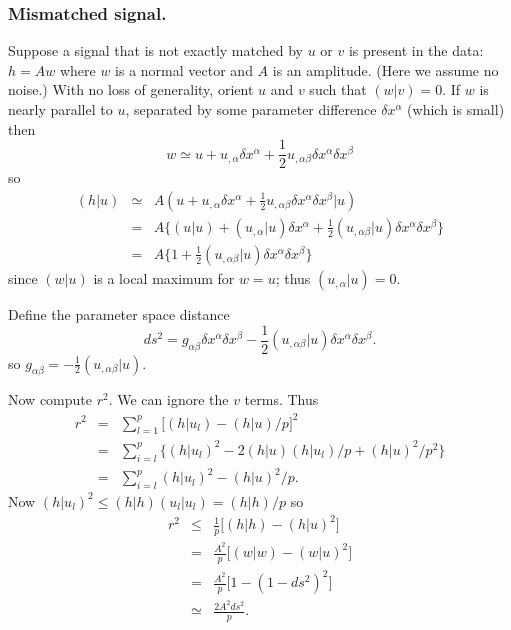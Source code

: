 \subsubsection{Mismatched signal.}
Suppose a signal that is not exactly matched by $u$ or $v$ is present in
the data: $h=Aw$ where $w$ is a normal vector and $A$ is an amplitude.
(Here we assume no noise.)  With no loss of generality, orient $u$ and $v$
such that $(w|v)=0$.  If $w$ is nearly parallel to $u$, separated by some
parameter difference $\delta x^\alpha$ (which is small) then
\begin{equation}
  w \simeq u + u_{,\alpha}\delta x^\alpha 
  + {\textstyle{\frac{1}{2}}}u_{,\alpha\beta}\delta x^\alpha\delta x^\beta
\end{equation}
so
\begin{eqnarray}
  (h|u) &\simeq& A(u + u_{,\alpha}\delta x^\alpha 
  + {\textstyle{\frac{1}{2}}} u_{,\alpha\beta}\delta x^\alpha\delta x^\beta|u)
  \nonumber\\
  &=& A\bigl\{ (u|u) + (u_{,\alpha}|u)\delta x^\alpha
  + {\textstyle{\frac{1}{2}}} (u_{,\alpha\beta}|u)\delta x^\alpha\delta x^\beta
  \bigr\}\nonumber\\
  &=& A\bigl\{ 1 +
  {\textstyle{\frac{1}{2}}} (u_{,\alpha\beta}|u)\delta x^\alpha\delta x^\beta
  \bigr\}
\end{eqnarray}
since $(w|u)$ is a local maximum for $w=u$; thus $(u_{,\alpha}|u)=0$.

Define the parameter space distance
\begin{equation}
  ds^2 = g_{\alpha\beta}\delta x^\alpha\delta x^\beta
  - {\textstyle{\frac{1}{2}}} (u_{,\alpha\beta}|u)\delta x^\alpha\delta x^\beta.
\end{equation}
so $g_{\alpha\beta}=-{\textstyle{\frac{1}{2}}}(u_{,\alpha\beta}|u)$.

Now compute $r^2$.  We can ignore the $v$ terms.  Thus
\begin{eqnarray}
  r^2 &=& \sum_{l=1}^p \bigl[ (h|u_l) - (h|u)/p \bigr]^2 \\
      &=& \sum_{i=l}^p \bigl\{ (h|u_l)^2 - 2(h|u)(h|u_l)/p + (h|u)^2/p^2 \bigr\}
          \\
      &=& \sum_{i=l}^p (h|u_l)^2 - (h|u)^2/p.
\end{eqnarray}
Now $(h|u_l)^2\le(h|h)(u_l|u_l)=(h|h)/p$ so
\begin{eqnarray}
  r^2 &\le& \frac{1}{p}\bigl[ (h|h) - (h|u)^2 \bigr] \\
      &=& \frac{A^2}{p}\bigl[ (w|w) - (w|u)^2 \bigr] \\
      &=& \frac{A^2}{p}\bigl[ 1 - ( 1 - ds^2 )^2 \bigr] \\
      &\simeq& \frac{2A^2ds^2}{p}.
\end{eqnarray}

